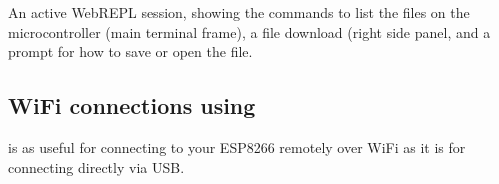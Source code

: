 \begin{marginfigure}[0cm]
	\begin{center}
		\caption[A WebREPL session with download.]{An active WebREPL session, showing the commands to list the files on the microcontroller (main terminal frame), a file download (right side panel, and a prompt for how to save or open the file.}
	\end{center}
\end{marginfigure}


%
%
%
%
%
%
%

\subsection{WiFi connections using \mpfshell}
\mpfshell is as useful for connecting to your ESP8266 remotely over WiFi as it is for connecting directly via USB. 

